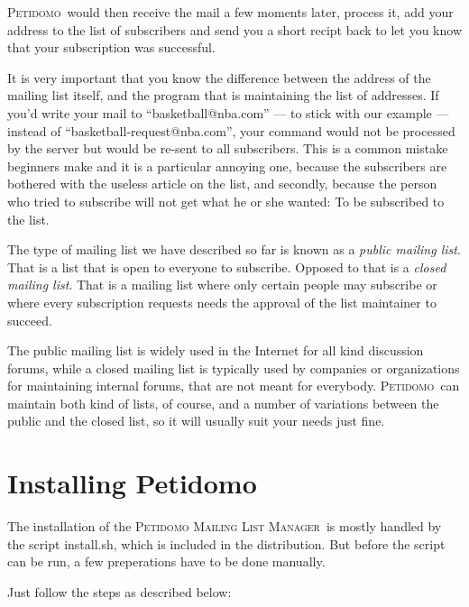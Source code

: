 \documentclass[a4paper,10pt]{scrreprt}
\newcommand{\PetidomoM}{{\scshape Peti\-domo Mail\-ing List Ma\-nager}}
\newcommand{\Petidomo}{{\scshape Peti\-domo}}
\newcommand{\Def}[1]{{\sl #1}}
\newcommand{\file}[1]{{\sf #1}}
\begin{document}
\Petidomo\ would then receive the mail a few moments later, process
it, add your address to the list of subscribers and send you a short
recipt back to let you know that your subscription was successful.

It is very important that you know the difference between the address
of the mailing list itself, and the program that is maintaining the
list of addresses. If you'd write your mail to ``basketball@nba.com''
--- to stick with our example --- instead of
``basketball-request@nba.com'', your command would not be processed by
the server but would be re-sent to all subscribers. This is a common
mistake beginners make and it is a particular annoying one, because
the subscribers are bothered with the useless article on the list, and
secondly, because the person who tried to subscribe will not get what
he or she wanted: To be subscribed to the list.

The type of mailing list we have described so far is known as a
\Def{public mailing list}. That is a list that is open to everyone to
subscribe. Opposed to that is a \Def{closed mailing list}. That is a
mailing list where only certain people may subscribe or where every
subscription requests needs the approval of the list maintainer to
succeed.

The public mailing list is widely used in the Internet for all kind
discussion forums, while a closed mailing list is typically used by
companies or organizations for maintaining internal forums, that are
not meant for everybody. \Petidomo\ can maintain both kind of lists,
of course, and a number of variations between the public and the
closed list, so it will usually suit your needs just fine.

\chapter{Installing Petidomo}

The installation of the \PetidomoM\ is mostly handled by the script
\file{install.sh}, which is included in the distribution. But before
the script can be run, a few preperations have to be done manually.

Just follow the steps as described below:
\end{document}
